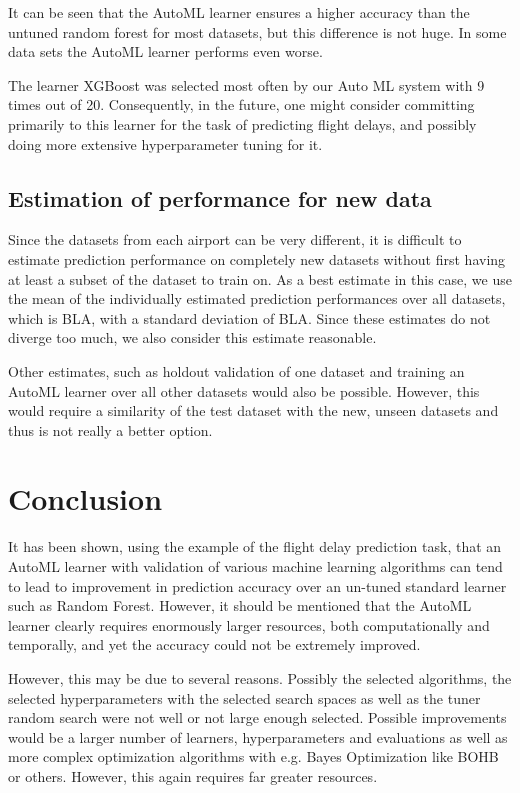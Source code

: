 \documentclass{article}
\begin{document}
It can be seen that the AutoML learner ensures a higher accuracy than the untuned random forest for most datasets, but this difference is not huge. In some data sets the AutoML learner performs even worse.

The learner XGBoost was selected most often by our Auto ML system with 9 times out of 20. Consequently, in the future, one might consider committing primarily to this learner for the task of predicting flight delays, and possibly doing more extensive hyperparameter tuning for it.

\subsection{Estimation of performance for new data}
Since the datasets from each airport can be very different, it is difficult to estimate prediction performance on completely new datasets without first having at least a subset of the dataset to train on. As a best estimate in this case, we use the mean of the individually estimated prediction performances over all datasets, which is BLA, with a standard deviation of BLA. Since these estimates do not diverge too much, we also consider this estimate reasonable. 

Other estimates, such as holdout validation of one dataset and training an AutoML learner over all other datasets would also be possible. However, this would require a similarity of the test dataset with the new, unseen datasets and thus is not really a better option.




\section{Conclusion}
It has been shown, using the example of the flight delay prediction task, that an AutoML learner with validation of various machine learning algorithms can tend to lead to improvement in prediction accuracy over an un-tuned standard learner such as Random Forest. However, it should be mentioned that the AutoML learner clearly requires enormously larger resources, both computationally and temporally, and yet the accuracy could not be extremely improved. 

However, this may be due to several reasons. Possibly the selected algorithms, the selected hyperparameters with the selected search spaces as well as the tuner random search were not well or not large enough selected. Possible improvements would be a larger number of learners, hyperparameters and evaluations as well as more complex optimization algorithms with e.g. Bayes Optimization like BOHB or others. However, this again requires far greater resources.
\end{document}
